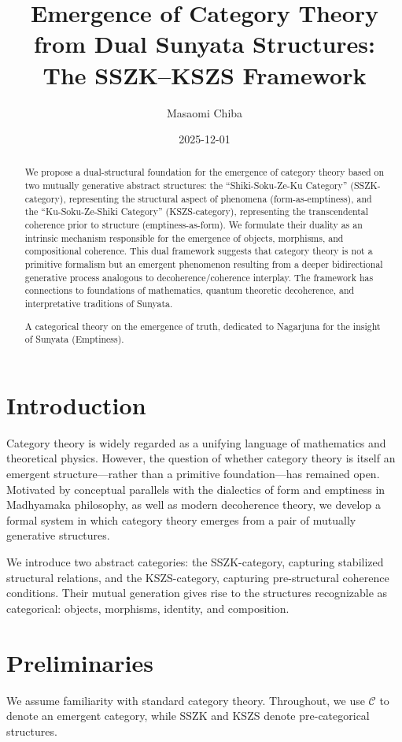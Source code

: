 \documentclass[11pt]{article}
\title{Emergence of Category Theory from Dual Sunyata Structures: \\ The SSZK--KSZS Framework}
\author{Masaomi Chiba}
\date{2025-12-01}
\begin{document}
\maketitle
\begin{abstract}
We propose a dual-structural foundation for the emergence of category theory based on two mutually generative abstract structures: the ``Shiki-Soku-Ze-Ku Category'' (SSZK-category), representing the structural aspect of phenomena (form-as-emptiness), and the ``Ku-Soku-Ze-Shiki Category'' (KSZS-category), representing the transcendental coherence prior to structure (emptiness-as-form). We formulate their duality as an intrinsic mechanism responsible for the emergence of objects, morphisms, and compositional coherence. This dual framework suggests that category theory is not a primitive formalism but an emergent phenomenon resulting from a deeper bidirectional generative process analogous to decoherence/coherence interplay. The framework has connections to foundations of mathematics, quantum theoretic decoherence, and interpretative traditions of Sunyata.

A categorical theory on the emergence of truth, dedicated to Nagarjuna for the insight of Sunyata (Emptiness).
\end{abstract}

\section{Introduction}
Category theory is widely regarded as a unifying language of mathematics and theoretical physics. However, the question of whether category theory is itself an emergent structure---rather than a primitive foundation---has remained open. Motivated by conceptual parallels with the dialectics of form and emptiness in Madhyamaka philosophy, as well as modern decoherence theory, we develop a formal system in which category theory emerges from a pair of mutually generative structures.

We introduce two abstract categories: the SSZK-category, capturing stabilized structural relations, and the KSZS-category, capturing pre-structural coherence conditions. Their mutual generation gives rise to the structures recognizable as categorical: objects, morphisms, identity, and composition.

\section{Preliminaries}
We assume familiarity with standard category theory. Throughout, we use $\mathcal{C}$ to denote an emergent category, while SSZK and KSZS denote pre-categorical structures.
\end{document}
